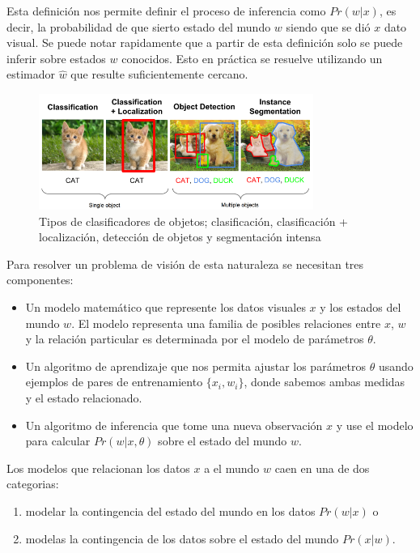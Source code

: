 \documentclass[letter,12pt]{report}
\begin{document}
Esta definición nos permite definir el proceso de inferencia como $Pr(w|x)$, es decir, la
probabilidad de que sierto estado del mundo $w$ siendo que se dió $x$ dato visual. Se
puede notar rapidamente que a partir de esta definición solo se puede inferir sobre
estados $w$ conocidos. Esto en práctica se resuelve utilizando un estimador $\hat{w}$ que
resulte suficientemente cercano.

\begin{figure}[H]
    \centering
    \includegraphics[width=0.8\textwidth]{obclass}
    \caption{Tipos de clasificadores de objetos; clasificación, clasificación +
    localización, detección de objetos y segmentación intensa}
    \label{fig:obclass}
\end{figure}

Para resolver un problema de visión de esta naturaleza se necesitan tres componentes:
\begin{itemize}
    \item Un modelo matemático que represente los datos visuales $x$ y los estados del
        mundo $w$. El modelo representa una familia de posibles relaciones entre $x$, 
        $w$ y la relación particular es determinada por el modelo de parámetros $\theta$.
    \item Un algoritmo de aprendizaje que nos permita ajustar los parámetros $\theta$
        usando ejemplos de pares de entrenamiento $\{x_i, w_i\}$, donde sabemos ambas
        medidas y el estado relacionado.
    \item Un algoritmo de inferencia que tome una nueva observación $x$ y use el modelo
        para calcular $Pr(w|x, \theta)$ sobre el estado del mundo $w$.
\end{itemize}

Los modelos que relacionan los datos $x$ a el mundo $w$ caen en una de dos categorias:
\begin{enumerate}
    \item modelar la contingencia del estado del mundo en los datos $Pr(w|x)$ o
    \item modelas la contingencia de los datos sobre el estado del mundo $Pr(x|w)$.
\end{enumerate}
\end{document}
